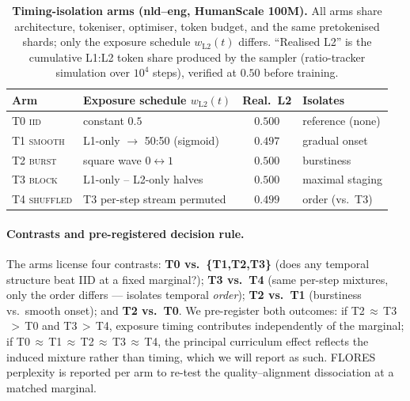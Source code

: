 \begin{table}[!ht]
  \centering \small
  \caption{\textbf{Timing-isolation arms (nld--eng, HumanScale 100M).} All arms share architecture, tokeniser, optimiser, token budget, and the same pretokenised shards; only the exposure schedule $w_{\mathrm{L2}}(t)$ differs. ``Realised L2'' is the cumulative L1:L2 token share produced by the sampler (ratio-tracker simulation over $10^4$ steps), verified at $0.50$ before training.}
  \label{tab:tiso_design}
  \begin{tabular}{@{}llcl@{}}
    \toprule
    Arm & Exposure schedule $w_{\mathrm{L2}}(t)$ & Real.\ L2 & Isolates \\
    \midrule
    T0 \textsc{iid}      & constant $0.5$                       & $0.500$ & reference (none) \\
    T1 \textsc{smooth}   & L1-only $\rightarrow$ 50:50 (sigmoid) & $0.497$ & gradual onset \\
    T2 \textsc{burst}    & square wave $0 \leftrightarrow 1$     & $0.500$ & burstiness \\
    T3 \textsc{block}    & L1-only -- L2-only halves             & $0.500$ & maximal staging \\
    T4 \textsc{shuffled} & T3 per-step stream permuted           & $0.499$ & order (vs.\ T3) \\
    \bottomrule
  \end{tabular}
\end{table}
 
\paragraph{Contrasts and pre-registered decision rule.} The arms license four contrasts: \textbf{T0 vs.\ \{T1,T2,T3\}} (does any temporal structure beat IID at a fixed marginal?); \textbf{T3 vs.\ T4} (same per-step mixtures, only the order differs --- isolates temporal \emph{order}); \textbf{T2 vs.\ T1} (burstiness vs.\ smooth onset); and \textbf{T2 vs.\ T0}. We pre-register both outcomes: if T2$\,{\approx}\,$T3$\,{>}\,$T0 and T3$\,{>}\,$T4, exposure timing contributes independently of the marginal; if T0$\,{\approx}\,$T1$\,{\approx}\,$T2$\,{\approx}\,$T3$\,{\approx}\,$T4, the principal curriculum effect reflects the induced mixture rather than timing, which we will report as such. FLORES perplexity is reported per arm to re-test the quality--alignment dissociation at a matched marginal.
 
